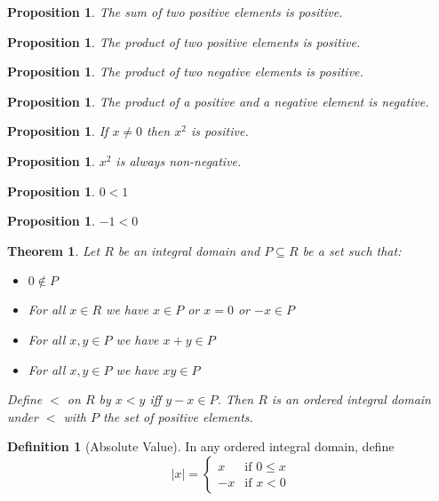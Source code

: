 \documentclass{article}
\newtheorem{proposition}[axiom]{Proposition}
\newtheorem{theorem}[axiom]{Theorem}
\theoremstyle{definition}
\newtheorem{definition}[axiom]{Definition}
\begin{document}
    \begin{proposition}
        The sum of two positive elements is positive.
    \end{proposition}

    \begin{proposition}
        The product of two positive elements is positive.
    \end{proposition}

    \begin{proposition}
        The product of two negative elements is positive.
    \end{proposition}

    \begin{proposition}
        The product of a positive and a negative element is negative.
    \end{proposition}

    \begin{proposition}
        If $x \neq 0$ then $x^2$ is positive.
    \end{proposition}

    \begin{proposition}
        $x^2$ is always non-negative.
    \end{proposition}

    \begin{proposition}
        $0 < 1$
    \end{proposition}

    \begin{proposition}
        $-1 < 0$
    \end{proposition}

    \begin{theorem}
        Let $R$ be an integral domain and $P \subseteq R$ be a set such that:
        \begin{itemize}
            \item $0 \notin P$
            \item For all $x \in R$ we have $x \in P$ or $x = 0$ or $-x \in P$
            \item For all $x,y \in P$ we have $x+y \in P$
            \item For all $x,y \in P$ we have $xy \in P$
        \end{itemize}
        Define $<$ on $R$ by $x < y$ iff $y - x \in P$. Then $R$ is an ordered integral domain under $<$
        with $P$ the set of positive elements.
    \end{theorem}

    \begin{definition}[Absolute Value]
        In any ordered integral domain, define
        \[ |x| = \begin{cases}
            x & \text{if $0 \leq x$} \\
            -x & \text{if $x < 0$}
        \end{cases} \]
    \end{definition}
\end{document}
